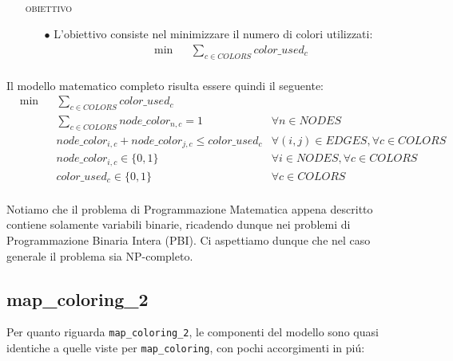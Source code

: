 \documentclass{article}
\begin{document}
\begin{itemize}
\begin{itemize}
\begin{equation*}
\begin{aligned}
	\end{aligned}
	\end{equation*}

	
	\end{itemize}


\item[] \textsc{obiettivo} 
	\begin{itemize}
	\item[$\bullet$] L'obiettivo consiste nel minimizzare il numero di colori utilizzati:\\
	\begin{equation*}
	\begin{aligned}
	& {\text{min}} & & \sum\limits_{c \in COLORS} color\_used_{c}\\
	
	\end{aligned}
	\end{equation*}

	
	\end{itemize}
\end{itemize}

Il modello matematico completo risulta essere quindi il seguente:\\

\begin{equation*}
\begin{aligned}
& {\text{min}} & & \sum\limits_{c \in COLORS} color\_used_{c} \\
& & &  \sum\limits_{c \in COLORS} node\_color_{n,c} = 1 & \forall n \in NODES\\ 
& & &  node\_color_{i,c} + node\_color_{j,c} \le color\_used_{c} & \forall (i,j) \in EDGES, \forall c \in COLORS\\
& & &  node\_color_{i,c} \in \{0, 1\} & \forall i \in NODES, \forall c \in COLORS\\
& & &  color\_used_{c} \in \{0, 1\} & \forall c \in COLORS\\

\end{aligned}
\end{equation*}

Notiamo che il problema di Programmazione Matematica appena descritto contiene solamente variabili binarie, ricadendo dunque nei problemi di Programmazione Binaria Intera (PBI). Ci aspettiamo dunque che nel caso generale il problema sia NP-completo.\\

\pagebreak

\subsection{map\_coloring\_2}
Per quanto riguarda \texttt{map\_coloring\_2}, le componenti del modello sono quasi identiche a quelle viste per \texttt{map\_coloring}, con pochi accorgimenti in pi\'u:\\
\end{document}
